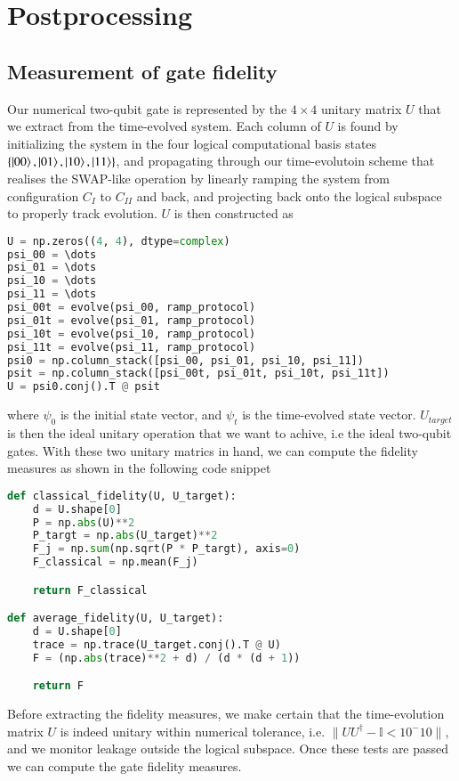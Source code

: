 \documentclass{subfiles}
\begin{document}
\section{Postprocessing}\label{sec:postprocessing}

\subsection{Measurement of gate fidelity}
Our numerical two-qubit gate is represented by the $4\times 4$ unitary matrix $U$ that we extract from the time-evolved system. Each column of $U$ is found by initializing the system in the four logical computational basis states $\{\ket{00}, \ket{01}, \ket{10}, \ket{11} \}$, and propagating through our time-evolutoin scheme that realises the SWAP-like operation by linearly ramping the system from configuration $C_I$ to $C_{II}$ and back, and projecting back onto the logical subspace to properly track evolution. $U$ is then constructed as
\begin{lstlisting}[language=Python]
U = np.zeros((4, 4), dtype=complex)
psi_00 = \dots
psi_01 = \dots
psi_10 = \dots
psi_11 = \dots
psi_00t = evolve(psi_00, ramp_protocol)
psi_01t = evolve(psi_01, ramp_protocol)
psi_10t = evolve(psi_10, ramp_protocol)
psi_11t = evolve(psi_11, ramp_protocol)
psi0 = np.column_stack([psi_00, psi_01, psi_10, psi_11])
psit = np.column_stack([psi_00t, psi_01t, psi_10t, psi_11t])
U = psi0.conj().T @ psit
\end{lstlisting}
where $\psi_0$ is the initial state vector, and $\psi_t$ is the time-evolved state vector. $U_{target}$ is then the ideal unitary operation that we want to achive, i.e the ideal two-qubit gates. With these two unitary matrics in hand, we can compute the fidelity measures as shown in the following code snippet 
\begin{lstlisting}[language=Python]
def classical_fidelity(U, U_target):
    d = U.shape[0]
    P = np.abs(U)**2
    P_targt = np.abs(U_target)**2
    F_j = np.sum(np.sqrt(P * P_targt), axis=0)
    F_classical = np.mean(F_j)

    return F_classical

def average_fidelity(U, U_target):
    d = U.shape[0]
    trace = np.trace(U_target.conj().T @ U)
    F = (np.abs(trace)**2 + d) / (d * (d + 1))

    return F
\end{lstlisting}
Before extracting the fidelity measures, we make certain that the time-evolution matrix $U$ is indeed unitary within numerical tolerance, i.e. $\|U U^\dagger - \mathbb{I} < 10^-{10}\|$, and we monitor leakage outside the logical subspace. Once these tests are passed we can compute the gate fidelity measures.
\end{document}
